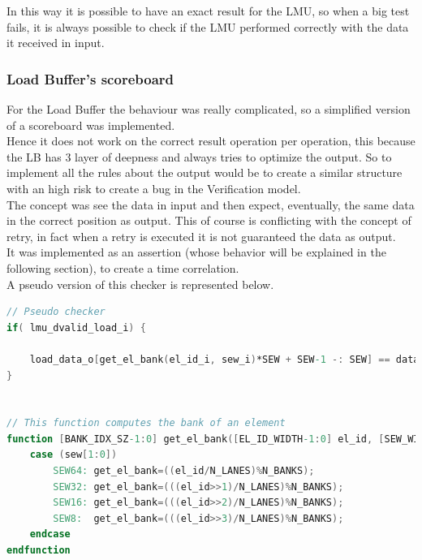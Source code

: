 In this way it is possible to have an exact result for the LMU, so when a big test fails, it is always possible to check if the LMU performed correctly with the data it received in input.\\

\subsubsection{Load Buffer's scoreboard}
For the Load Buffer the behaviour was really complicated, so a simplified  version of a scoreboard was implemented.\\

Hence it does not work on the correct result operation per operation, this because the LB has 3 layer of deepness and always tries to optimize the output. So to implement all the rules about the output would be to create a similar structure with an high risk to create a bug in the Verification model.\\

The concept was see the data in input and then expect, eventually, the same data in the correct position as output. This of course is conflicting with the concept of retry, in fact when a retry is executed it is not guaranteed the data as output.\\

It was implemented as an assertion (whose behavior will be explained in the following section), to create a time correlation.\\

A pseudo version of this checker is represented below.
\bigskip

\begin{lstlisting}[language=Verilog,style=verilog-style, backgroundcolor=\color{lyel_palette}, frame=tlb]
// Pseudo checker
if( lmu_dvalid_load_i) { 

    load_data_o[get_el_bank(el_id_i, sew_i)*SEW + SEW-1 -: SEW] == data_i;
}


// This function computes the bank of an element
function [BANK_IDX_SZ-1:0] get_el_bank([EL_ID_WIDTH-1:0] el_id, [SEW_WIDTH-1:0] sew);
    case (sew[1:0])
        SEW64: get_el_bank=((el_id/N_LANES)%N_BANKS); 
        SEW32: get_el_bank=(((el_id>>1)/N_LANES)%N_BANKS); 
        SEW16: get_el_bank=(((el_id>>2)/N_LANES)%N_BANKS); 
        SEW8:  get_el_bank=(((el_id>>3)/N_LANES)%N_BANKS); 
    endcase
endfunction

\end{lstlisting}
\bigskip


